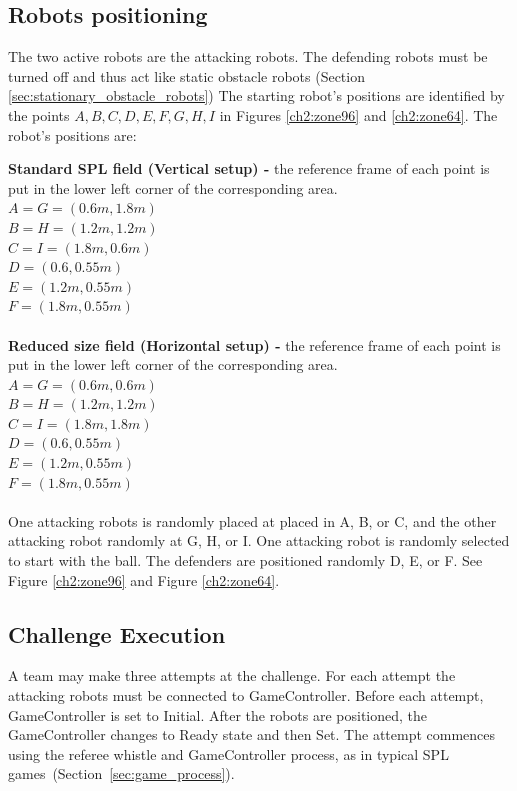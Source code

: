 \subsection{Robots positioning}
The two active robots are the attacking robots. The defending robots must be turned off and thus act like static obstacle robots (\cf Section \ref{sec:stationary_obstacle_robots})
The starting robot's positions are identified by the points ${A,B,C,D,E,F,G,H,I}$ in Figures \ref{ch2:zone96} and \ref{ch2:zone64}.
The robot's positions are:

\textbf{Standard SPL field (Vertical setup) -} the reference frame of each point is put in the lower left corner of the corresponding area.
\\
$A = G = (0.6m, 1.8m)$
\\
$B = H = (1.2m, 1.2m)$
\\
$C = I = (1.8m, 0.6m)$
\\
$D = (0.6, 0.55m)$
\\
$E = (1.2m, 0.55m)$
\\
$F = (1.8m, 0.55m)$
\\
\\
\textbf{Reduced size field (Horizontal setup) -} the reference frame of each point is put in the lower left corner of the corresponding area.
\\
$A = G = (0.6m, 0.6m)$
\\
$B = H = (1.2m, 1.2m)$
\\
$C = I = (1.8m, 1.8m)$
\\
$D = (0.6, 0.55m)$
\\
$E = (1.2m, 0.55m)$
\\
$F = (1.8m, 0.55m)$
\\
\\
One attacking robots is randomly placed at placed in A, B, or C, and the other attacking robot randomly at G, H, or I.  One attacking robot is randomly selected to start with the ball. The defenders are positioned randomly D, E, or F.
See Figure \ref{ch2:zone96} and Figure \ref{ch2:zone64}.

\subsection{Challenge Execution}
A team may make three attempts at the challenge. For each attempt the attacking robots must be connected to GameController.
Before each attempt, GameController is set to Initial. After the robots are positioned, the GameController changes to Ready state and then Set. The attempt commences using the referee whistle and GameController process, as in typical SPL games~(\cf Section~\ref{sec:game_process}). 

